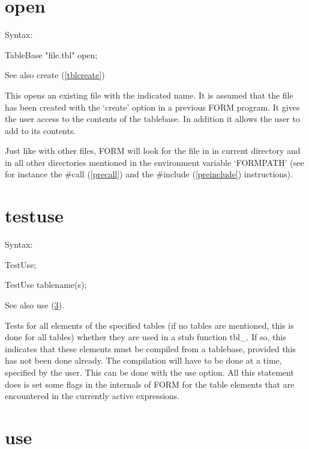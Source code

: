 
\section{open}
\label{tblopen}

\noindent Syntax:

TableBase "file.tbl" open;

\noindent See also create (\ref{tblcreate})

\noindent This opens an existing file with the indicated name. 
It is assumed that the file has been created with the 
`create' option in a previous FORM program. It gives the user access to the 
contents of the tablebase. In addition it allows the user to add to its 
contents.

\noindent Just like with other files, FORM will look for the file in in 
current directory and in all other directories mentioned in the environment 
variable `FORMPATH' (see for instance the 
\#call (\ref{precall}) and the \#include 
(\ref{preinclude}) instructions).


\section{testuse}
\label{tbltestuse}

\noindent Syntax:

TestUse;

TestUse tablename(s);

\noindent See also use (\ref{tbluse}).

\noindent Tests for all elements of the specified tables (if 
no tables are mentioned, this is done for all tables) whether they are used 
in a stub function tbl\_. If so, this indicates 
that these elements must be compiled from a tablebase, provided this has 
not been done already. The compilation will have to be done at a time, 
specified by the user. This can be done with the use option. All 
this statement does is set some flags in the internals of FORM for the 
table elements that are encountered in the currently active expressions.


\section{use}
\label{tbluse}

